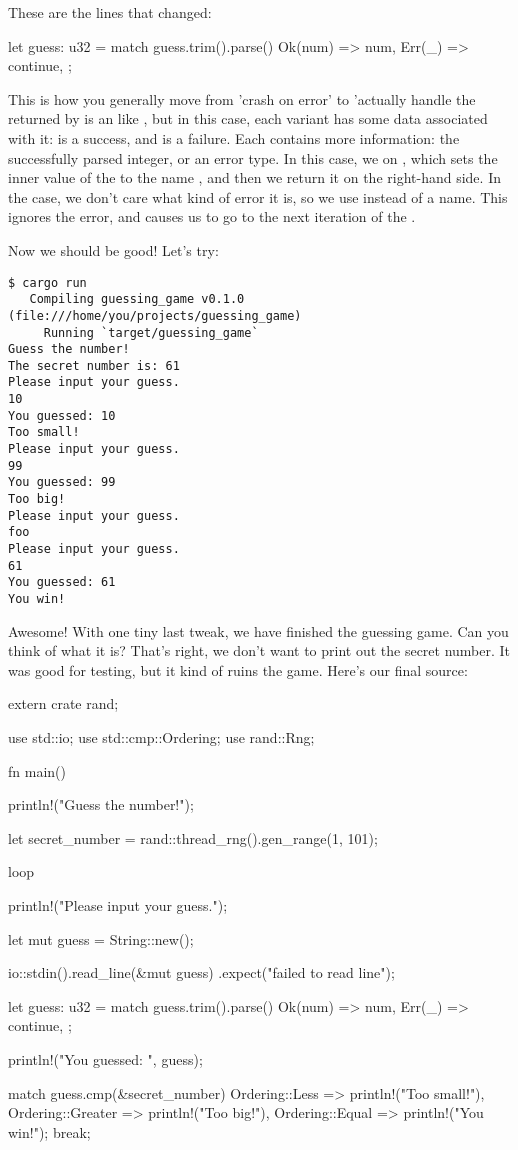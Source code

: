These are the lines that changed:

\begin{rustc}
let guess: u32 = match guess.trim().parse() {
    Ok(num) => num,
    Err(_) => continue,
};
\end{rustc}

This is how you generally move from 'crash on error' to 'actually handle the returned by  is an  like
, but in this case, each variant has some data associated with it:  is a success, and  is a
failure. Each contains more information: the successfully parsed integer, or an error type. In this case, we  on 
, which sets the inner value of the  to the name , and then we return it on the right-hand side. 
In the  case, we don't care what kind of error it is, so we use \code{\_} instead of a name. This ignores the error, and
 causes us to go to the next iteration of the .

\blank

Now we should be good! Let's try:

\begin{verbatim}
$ cargo run
   Compiling guessing_game v0.1.0 (file:///home/you/projects/guessing_game)
     Running `target/guessing_game`
Guess the number!
The secret number is: 61
Please input your guess.
10
You guessed: 10
Too small!
Please input your guess.
99
You guessed: 99
Too big!
Please input your guess.
foo
Please input your guess.
61
You guessed: 61
You win!
\end{verbatim}

Awesome! With one tiny last tweak, we have finished the guessing game. Can you think of what it is? That's right, we don't want 
to print out the secret number. It was good for testing, but it kind of ruins the game. Here's our final source:

\begin{rustc}
extern crate rand;

use std::io;
use std::cmp::Ordering;
use rand::Rng;

fn main() {
    println!("Guess the number!");

    let secret_number = rand::thread_rng().gen_range(1, 101);

    loop {
        println!("Please input your guess.");

        let mut guess = String::new();

        io::stdin().read_line(&mut guess)
            .expect("failed to read line");

        let guess: u32 = match guess.trim().parse() {
            Ok(num) => num,
            Err(_) => continue,
        };

        println!("You guessed: {}", guess);

        match guess.cmp(&secret_number) {
            Ordering::Less    => println!("Too small!"),
            Ordering::Greater => println!("Too big!"),
            Ordering::Equal   => {
                println!("You win!");
                break;
            }
        }
    }
}
\end{rustc}

